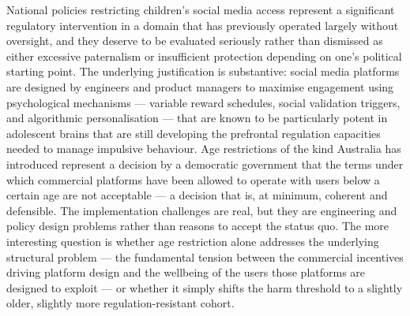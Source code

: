 National policies restricting children's social media access represent a significant regulatory intervention in a domain that has previously operated largely without oversight, and they deserve to be evaluated seriously rather than dismissed as either excessive paternalism or insufficient protection depending on one's political starting point. The underlying justification is substantive: social media platforms are designed by engineers and product managers to maximise engagement using psychological mechanisms — variable reward schedules, social validation triggers, and algorithmic personalisation — that are known to be particularly potent in adolescent brains that are still developing the prefrontal regulation capacities needed to manage impulsive behaviour. Age restrictions of the kind Australia has introduced represent a decision by a democratic government that the terms under which commercial platforms have been allowed to operate with users below a certain age are not acceptable — a decision that is, at minimum, coherent and defensible. The implementation challenges are real, but they are engineering and policy design problems rather than reasons to accept the status quo. The more interesting question is whether age restriction alone addresses the underlying structural problem — the fundamental tension between the commercial incentives driving platform design and the wellbeing of the users those platforms are designed to exploit — or whether it simply shifts the harm threshold to a slightly older, slightly more regulation-resistant cohort.

\separator


